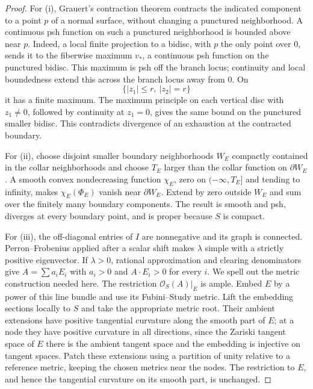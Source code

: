\documentclass[11pt]{amsart}
\theoremstyle{definition}
\theoremstyle{remark}
\numberwithin{equation}{section}
\newcommand{\OO}{\mathcal O}
\begin{document}
\begin{proof}
For \textup{(i)}, Grauert's contraction theorem \cite[\S4, subsection~8(e), pp.~366--367]{Grauert1962}
contracts the indicated component to a point $p$ of a normal surface,
without changing a punctured neighborhood. A continuous psh function
on such a punctured neighborhood is bounded above near $p$. Indeed,
a local finite projection to a bidisc, with $p$ the only point over
$0$, sends it to the fiberwise maximum $v_*$, a continuous psh function
on the punctured bidisc. This maximum is psh off the branch locus;
continuity and local boundedness extend this across the branch locus
away from $0$. On
\[
 \{|z_1|\le r,\ |z_2|=r\}
\]
it has a finite maximum. The maximum principle on each vertical disc
with $z_1\ne0$, followed by continuity at $z_1=0$, gives the same bound
on the punctured smaller bidisc. This contradicts divergence of an
exhaustion at the contracted boundary.

For \textup{(ii)}, choose disjoint smaller boundary neighborhoods $W_E$
compactly contained in the collar neighborhoods and choose $T_E$ larger
than the collar function on $\partial W_E$. A smooth convex
nondecreasing function $\chi_E$, zero on $(-\infty,T_E]$ and tending to
infinity, makes $\chi_E(\Phi_E)$ vanish near $\partial W_E$. Extend by
zero outside $W_E$ and sum over the finitely many boundary components.
The result is smooth and psh, diverges at every boundary point, and is
proper because $S$ is compact.

For \textup{(iii)}, the off-diagonal entries of $I$ are nonnegative and
its graph is connected. Perron--Frobenius applied after a scalar shift
makes $\lambda$ simple with a strictly positive eigenvector. If
$\lambda>0$, rational approximation and clearing denominators give
$A=\sum a_iE_i$ with $a_i>0$ and $A\cdot E_i>0$ for every $i$.
We spell out the metric construction needed here. The restriction
$\OO_S(A)|_E$ is ample. Embed $E$ by a power of this line bundle and
use its Fubini--Study metric. Lift the embedding sections locally to
$S$ and take the appropriate metric root. Their ambient extensions
have positive tangential curvature along the smooth part of $E$;
at a node they have positive curvature in all directions, since the
Zariski tangent space of $E$ there is the ambient tangent space and
the embedding is injective on tangent spaces. Patch these extensions
using a partition of unity relative to a reference metric, keeping
the chosen metrics near the nodes. The restriction to $E$, and hence
the tangential curvature on its smooth part, is unchanged.


\end{proof}
\end{document}
